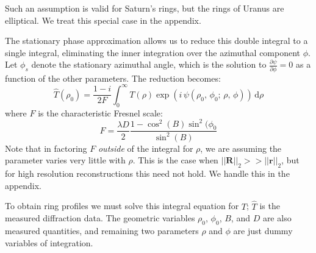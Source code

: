 \documentclass{article}
\begin{document}
        Such an assumption is valid for Saturn's rings, but the rings of
        Uranus are elliptical. We treat this special case in the appendix.
        \par\hfill\par
        The stationary phase approximation allows us to reduce this double
        integral to a single integral, eliminating the inner integration over
        the azimuthal component $\phi$. Let $\phi_{s}$ denote the stationary
        azimuthal angle, which is the solution to
        $\frac{\partial\psi}{\partial\phi}=0$ as a function of the other
        parameters. The reduction becomes:
        \begin{equation}
            \hat{T}(\rho_{0})
            =\frac{1-i}{2F}\int_{0}^{\infty}
                T(\rho)\exp\left(
                    i\,\psi(\rho_{0},\,\phi_{0};\,\rho,\,\phi)
                \right)
                \,\textrm{d}\rho
        \end{equation}
        where $F$ is the characteristic Fresnel scale:
        \begin{equation}
            F=\frac{\lambda{D}}{2}\frac{1-\cos^{2}(B)\sin^{2}(\phi_{0}}{\sin^{2}(B)}
        \end{equation}
        Note that in factoring $F$ \textit{outside} of the integral for
        $\rho$, we are assuming the parameter varies very little with $\rho$.
        This is the case when $||\mathbf{R}||_{2}>>||\mathbf{r}||_{2}$, but
        for high resolution reconstructions this need not hold. We
        handle this in the appendix.
        \par\hfill\par
        To obtain ring profiles we must solve this integral equation for $T$;
        $\hat{T}$ is the measured diffraction data.
        The geometric variables $\rho_{0}$, $\phi_{0}$, $B$, and $D$ are also
        measured quantities, and remaining two parameters $\rho$ and $\phi$ are
        just dummy variables of integration.
\end{document}
